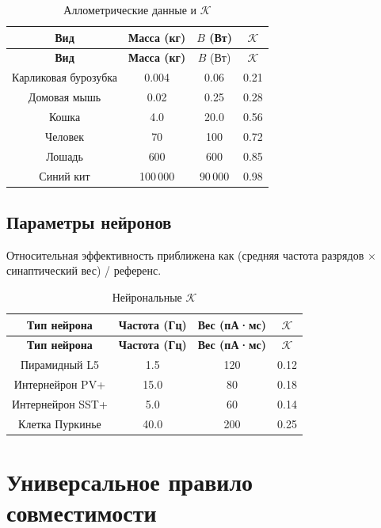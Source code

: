 \documentclass[12pt,a4paper]{article}
\newcommand{\REL}{\mathcal{K}}          %
\begin{document}
	\begin{longtable}{|c|c|c|c|}
		\caption{Аллометрические данные и \(\REL\)}\label{tab:allometry}\\
		\hline
		\textbf{Вид} & \textbf{Масса (кг)} & \(B\) (Вт) & \(\REL\) \\
		\hline
		\endfirsthead
		\hline
		\textbf{Вид} & \textbf{Масса (кг)} & \(B\) (Вт) & \(\REL\) \\
		\hline
		\endhead
		\hline
		Карликовая бурозубка & 0.004 & 0.06 & 0.21 \\
		Домовая мышь & 0.02 & 0.25 & 0.28 \\
		Кошка & 4.0 & 20.0 & 0.56 \\
		Человек & 70 & 100 & 0.72 \\
		Лошадь & 600 & 600 & 0.85 \\
		Синий кит & 100\,000 & 90\,000 & 0.98 \\
		\hline
	\end{longtable}
	
	\subsection{Параметры нейронов}
	\label{sec:neural}
	Относительная эффективность приближена как (средняя частота разрядов \(\times\) синаптический вес) / референс.
	
	\begin{longtable}{|c|c|c|c|}
		\caption{Нейрональные \(\REL\)}\label{tab:neural}\\
		\hline
		\textbf{Тип нейрона} & \textbf{Частота (Гц)} & \textbf{Вес (пА·мс)} & \(\REL\) \\
		\hline
		\endfirsthead
		\hline
		\textbf{Тип нейрона} & \textbf{Частота (Гц)} & \textbf{Вес (пА·мс)} & \(\REL\) \\
		\hline
		\endhead
		\hline
		Пирамидный L5 & 1.5 & 120 & 0.12 \\
		Интернейрон PV+ & 15.0 & 80 & 0.18 \\
		Интернейрон SST+ & 5.0 & 60 & 0.14 \\
		Клетка Пуркинье & 40.0 & 200 & 0.25 \\
		\hline
	\end{longtable}
	
	\section{Универсальное правило совместимости}
	\label{sec:compatibility}
	
\end{document}
